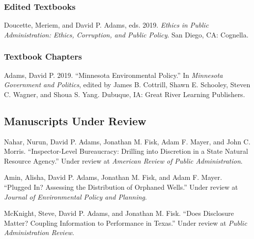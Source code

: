\documentclass[12pt,letterpaper]{article}
\renewenvironment{itemize}{
  \begin{list}{}{
    \setlength{\leftmargin}{1.5em}
    \setlength{\itemsep}{0.25em}
    \setlength{\parskip}{0pt}
    \setlength{\parsep}{0.25em}
  }
}{
  \end{list}
}
\begin{document}
\subsubsection*{Edited Textbooks}
\begin{itemize}\leftmargin=2pt\itemindent=-15pt
  \item Doucette, Meriem, and David P. Adams, eds. 2019. \emph{Ethics in Public Administration: Ethics, Corruption, and Public Policy}. San Diego, CA: Cognella.
\end{itemize}

\subsubsection*{Textbook Chapters}
\begin{itemize}\leftmargin=2pt\itemindent=-15pt
  \item Adams, David P. 2019. ``Minnesota Environmental Policy.'' In \emph{Minnesota Government and Politics}, edited by James B. Cottrill, Shawn E. Schooley, Steven C. Wagner, and Shoua S. Yang. Dubuque, IA: Great River Learning Publishers.
\end{itemize}

\subsection*{Manuscripts Under Review}
\begin{itemize}\leftmargin=2pt\itemindent=-15pt\leftmargin=2pt\itemindent=-15pt
  
  \item Nahar, Nurun, David P. Adams, Jonathan M. Fisk, Adam F. Mayer, and John C. Morris. ``Inspector-Level Bureaucracy: Drilling into Discretion in a State Natural Resource Agency.'' Under review at \emph{American Review of Public Administration}.
  
  \item Amin, Alisha, David P. Adams, Jonathan M. Fisk, and Adam F. Mayer. ``Plugged In? Assessing the Distribution of Orphaned Wells.'' Under review at \emph{Journal of Environmental Policy and Planning}.
  
  \item McKnight, Steve, David P. Adams, and Jonathan M. Fisk. ``Does Disclosure Matter? Coupling Information to Performance in Texas.'' Under review at \emph{Public Administration Review}.

\end{itemize}
\end{document}
